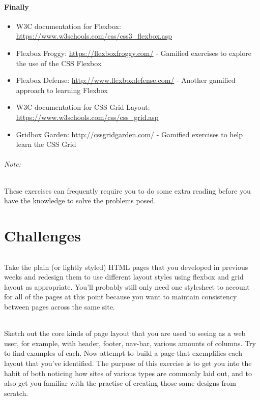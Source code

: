 \documentclass[10pt, a4paper]{article}
\begin{document}
\subsection*{Finally}
\begin{itemize}
\item W3C documentation for Flexbox: \url{https://www.w3schools.com/css/css3_flexbox.asp}
\item Flexbox Froggy: \url{https://flexboxfroggy.com/} - Gamified exercises to explore the use of the CSS Flexbox
\item Flexbox Defense: \url{http://www.flexboxdefense.com/} - Another gamified approach to learning Flexbox
\item W3C documentation for CSS Grid Layout: \url{https://www.w3schools.com/css/css_grid.asp}
\item Gridbox Garden: \url{http://cssgridgarden.com/} - Gamified exercises to help learn the CSS Grid
\end{itemize}

\paragraph{Note:} These exercises can frequently require you to do some extra reading before you have the knowledge to solve the problems posed.




\clearpage
\part{Challenges}
\paragraph{} Take the plain (or lightly styled) HTML pages that you developed in previous weeks and redesign them to use different layout styles using flexbox and grid layout as appropriate. You'll probably still only need one stylesheet to account for all of the pages at this point because you want to maintain consistency between pages across the same site.

\paragraph{} Sketch out the core kinds of page layout that you are used to seeing as a web user, for example, with header, footer, nav-bar, various amounts of columns. Try to find examples of each. Now attempt to build a page that exemplifies each layout that you've identified. The purpose of this exercise is to get you into the habit of both noticing how sites of various types are commonly laid out, and to also get you familiar with the practise of creating those same designs from scratch.
\end{document}
